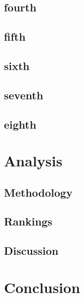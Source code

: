 \documentclass[titlepage]{article}
\begin{document}
	\subsection{fourth}
	\subsection{fifth}
	\subsection{sixth}
	\subsection{seventh}
	\subsection{eighth}

\section{Analysis}
	\subsection{Methodology}
	\subsection{Rankings}
	\subsection{Discussion}

\section{Conclusion}

\end{document}
